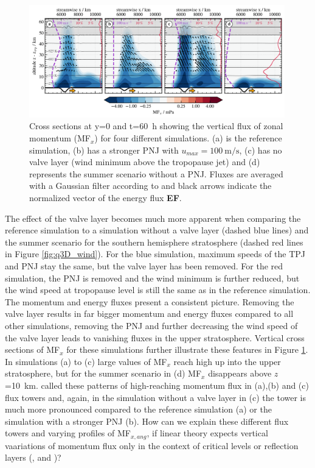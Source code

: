 \begin{figure}[t]
    \centering
    \includegraphics[width=0.99\textwidth]{figures_q3D/Q3D-MFx-towers.png}
    \caption{Cross sections at y=0 and t=\SI{60}{\hour} showing the vertical flux of zonal momentum (MF$_x$) for four different simulations. (a) is the reference simulation, (b) has a stronger PNJ with $u_{max}=\SI{100}{\meter\per\second}$, (c) has no valve layer (wind minimum above the tropopause jet) and (d) represents the summer scenario without a PNJ. Fluxes are averaged with a Gaussian filter according to \textcite[]{kruse_gravity_2015} and black arrows indicate the normalized vector of the energy flux \textbf{EF}.}
    \label{fig:q3D-mfx-towers}
\end{figure}
The effect of the valve layer becomes much more apparent when comparing the reference simulation to a simulation without a valve layer (dashed blue lines) and the summer scenario for the southern hemisphere stratosphere (dashed red lines in Figure \ref{fig:q3D_wind}). For the blue simulation, maximum speeds of the TPJ and PNJ stay the same, but the valve layer has been removed. For the red simulation, the PNJ is removed and the wind minimum is further reduced, but the wind speed at tropopause level is still the same as in the reference simulation. The momentum and energy fluxes present a consistent picture. Removing the valve layer results in far bigger momentum and energy fluxes compared to all other simulations, removing the PNJ and further decreasing the wind speed of the valve layer leads to vanishing fluxes in the upper stratosphere. Vertical cross sections of MF$_x$ for these simulations further illustrate these features in Figure \ref{fig:q3D-mfx-towers}. In simulations (a) to (c) large values of MF$_x$ reach high up into the upper stratosphere, but for the summer scenario in (d) MF$_x$ disappears above $z$=\SI{10}{\kilo\meter}. \textcite[]{kruse_gravity_2015} called these patterns of high-reaching momentum flux in (a),(b) and (c) flux towers and, again, in the simulation without a valve layer in (c) the tower is much more pronounced compared to the reference simulation (a) or the simulation with a stronger PNJ (b). How can we explain these different flux towers and varying profiles of MF$_{x,ang}$, if linear theory expects vertical vaariations of momentum flux only in the context of critical levels or reflection layers (\cite[]{booker_critical_1967}, \cite[]{jones_propagation_1967} and \cite[]{broad_linear_1995})? \\
